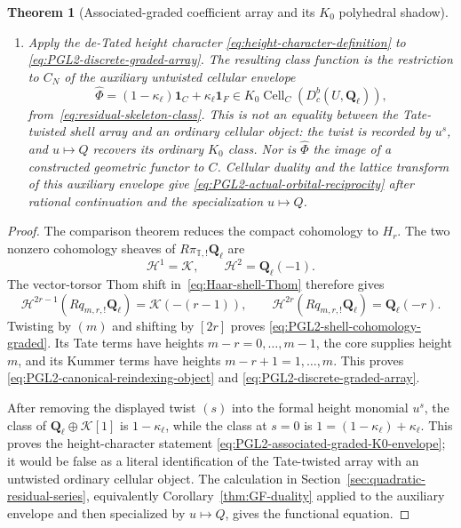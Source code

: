 \documentclass[11pt]{article}
\newtheorem{theorem}{Theorem}[section]
\theoremstyle{definition}
\theoremstyle{remark}
\newcommand{\Qell}{\mathbf Q_\ell}
\newcommand{\kappaell}{\kappa_{\ell}}
\newcommand{\one}{\mathbf 1}
\newcommand{\cK}{\mathcal K}
\newcommand{\Cell}{\operatorname{Cell}}
\begin{document}
\begin{theorem}[Associated-graded coefficient array and its $K_0$ polyhedral shadow]
\begin{enumerate}[label=\textup{(\roman*)}]
  incidence-bearing cone $C$.
\item Apply the de-Tated height character
  \eqref{eq:height-character-definition} to
  \eqref{eq:PGL2-discrete-graded-array}.  The resulting class function is the
  restriction to $C_N$ of the auxiliary untwisted cellular envelope
  \begin{equation}
   \widehat\Phi=(1-\kappaell)\one_C+\kappaell\one_F
   \in K_0\Cell_C(D_c^b(U,\Qell)),
   \label{eq:PGL2-associated-graded-K0-envelope}
  \end{equation}
  from~\eqref{eq:residual-skeleton-class}.  This is not an equality between
  the Tate-twisted shell array and an ordinary cellular object: the twist is
  recorded by $u^s$, and $u\mapsto Q$ recovers its ordinary $K_0$ class.
  Nor is $\widehat\Phi$ the image of a constructed geometric functor to $C$.
  Cellular duality and the lattice transform of this auxiliary envelope give
  \eqref{eq:PGL2-actual-orbital-reciprocity} after rational continuation and
  the specialization $u\mapsto Q$.
\end{enumerate}
\end{theorem}

\begin{proof}
The comparison theorem reduces the compact cohomology to $H_r$.  The two
nonzero cohomology sheaves of $R\pi_{\mathbb T,!}\Qell$ are
\[
 \mathcal H^1=\cK,
 \qquad \mathcal H^2=\Qell(-1).
\]
The vector-torsor Thom shift in~\eqref{eq:Haar-shell-Thom} therefore gives
\[
 \mathcal H^{2r-1}(Rq_{m,r,!}\Qell)=\cK(-(r-1)),
 \qquad
 \mathcal H^{2r}(Rq_{m,r,!}\Qell)=\Qell(-r).
\]
Twisting by $(m)$ and shifting by $[2r]$ proves
\eqref{eq:PGL2-shell-cohomology-graded}.  Its Tate terms have heights
$m-r=0,\ldots,m-1$, the core supplies height $m$, and its Kummer terms have
heights $m-r+1=1,\ldots,m$.  This proves
\eqref{eq:PGL2-canonical-reindexing-object} and
\eqref{eq:PGL2-discrete-graded-array}.

After removing the displayed twist $(s)$ into the formal height monomial
$u^s$, the class of $\Qell\oplus\cK[1]$ is $1-\kappaell$, while the class at
$s=0$ is $1=(1-\kappaell)+\kappaell$.  This proves the height-character statement
\eqref{eq:PGL2-associated-graded-K0-envelope}; it would be false as a literal
identification of the Tate-twisted array with an untwisted ordinary cellular
object.  The calculation in
Section~\ref{sec:quadratic-residual-series}, equivalently
Corollary~\ref{thm:GF-duality} applied to the auxiliary envelope and then
specialized by $u\mapsto Q$, gives the functional equation.
\end{proof}
\end{document}

